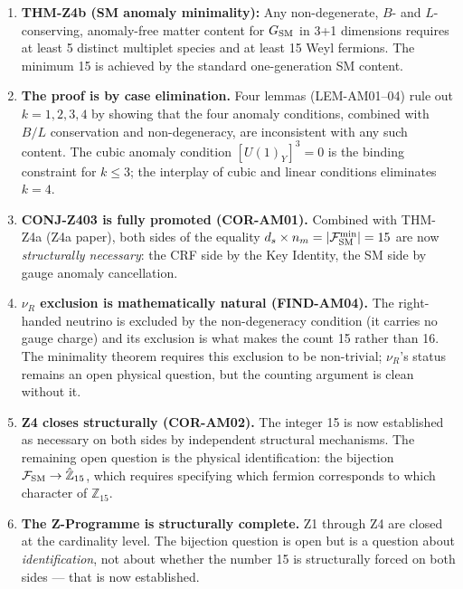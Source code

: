 \documentclass[12pt, a4paper]{article}
\begin{document}
\begin{enumerate}[leftmargin=*]

\item \textbf{THM-Z4b (SM anomaly minimality):} Any non-degenerate,
  $B$- and $L$-conserving, anomaly-free matter content for $G_{\rm SM}$
  in 3+1 dimensions requires at least 5 distinct multiplet species
  and at least 15 Weyl fermions. The minimum 15 is achieved by the
  standard one-generation SM content.

\item \textbf{The proof is by case elimination.} Four lemmas
  (LEM-AM01--04) rule out $k = 1, 2, 3, 4$ by showing that the
  four anomaly conditions, combined with $B/L$ conservation and
  non-degeneracy, are inconsistent with any such content. The
  cubic anomaly condition $[U(1)_Y]^3 = 0$ is the binding constraint
  for $k \leq 3$; the interplay of cubic and linear conditions
  eliminates $k = 4$.

\item \textbf{CONJ-Z403 is fully promoted (COR-AM01).} Combined
  with THM-Z4a (Z4a paper), both sides of the equality
  $d_s \times n_m = |\mathcal{F}_{\rm SM}^{\rm min}| = 15$ are now
  \emph{structurally necessary}: the CRF side by the Key Identity,
  the SM side by gauge anomaly cancellation.

\item \textbf{$\nu_R$ exclusion is mathematically natural (FIND-AM04).}
  The right-handed neutrino is excluded by the non-degeneracy
  condition (it carries no gauge charge) and its exclusion is what
  makes the count 15 rather than 16. The minimality theorem requires
  this exclusion to be non-trivial; $\nu_R$'s status remains an
  open physical question, but the counting argument is clean without
  it.

\item \textbf{Z4 closes structurally (COR-AM02).} The integer 15
  is now established as necessary on both sides by independent
  structural mechanisms. The remaining open question is the physical
  identification: the bijection $\mathcal{F}_{\rm SM} \to
  \hat{\mathbb{Z}}_{15}$, which requires specifying which fermion
  corresponds to which character of $\mathbb{Z}_{15}$.

\item \textbf{The Z-Programme is structurally complete.}
  Z1 through Z4 are closed at the cardinality level. The bijection
  question is open but is a question about \emph{identification},
  not about whether the number 15 is structurally forced on both
  sides --- that is now established.

\end{enumerate}
\end{document}

